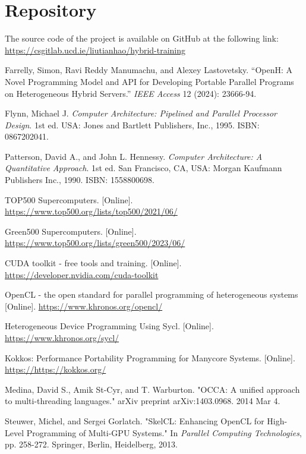 \documentclass[13pt]{article}
\begin{document}
\section{Repository}
The source code of the project is available on GitHub at the following link: \url{https://csgitlab.ucd.ie/liutianhao/hybrid-training}

\newpage
\begin{thebibliography}{9} %

    Farrelly, Simon, Ravi Reddy Manumachu, and Alexey Lastovetsky. 
    ``OpenH: A Novel Programming Model and API for Developing Portable Parallel Programs on Heterogeneous Hybrid Servers.'' 
    \textit{IEEE Access} 12 (2024): 23666-94.
    
    Flynn, Michael J. 
    \textit{Computer Architecture: Pipelined and Parallel Processor Design}. 
    1st ed. USA: Jones and Bartlett Publishers, Inc., 1995. 
    ISBN: 0867202041.
    
    Patterson, David A., and John L. Hennessy. 
    \textit{Computer Architecture: A Quantitative Approach}. 
    1st ed. San Francisco, CA, USA: Morgan Kaufmann Publishers Inc., 1990. 
    ISBN: 1558800698.

    TOP500 Supercomputers. [Online].
    \url{https://www.top500.org/lists/top500/2021/06/}

    Green500 Supercomputers. [Online].
    \url{https://www.top500.org/lists/green500/2023/06/}


    CUDA toolkit - free tools and training. [Online].
    \url{https://developer.nvidia.com/cuda-toolkit}

    OpenCL - the open standard for parallel programming of heterogeneous systems [Online].
    \url{https://www.khronos.org/opencl/}

    Heterogeneous Device Programming Using Sycl. [Online].
    \url{https://www.khronos.org/sycl/}


    Kokkos: Performance Portability Programming for Manycore Systems. [Online].
    \url{https://https://kokkos.org/}

    Medina, David S., Amik St-Cyr, and T. Warburton. 
    "OCCA: A unified approach to multi-threading languages."
    arXiv preprint arXiv:1403.0968. 2014 Mar 4.


    Steuwer, Michel, and Sergei Gorlatch.
    "SkelCL: Enhancing OpenCL for High-Level Programming of Multi-GPU Systems."
    In \textit{Parallel Computing Technologies}, pp. 258-272. Springer, Berlin, Heidelberg, 2013.


\end{thebibliography}
\end{document}
